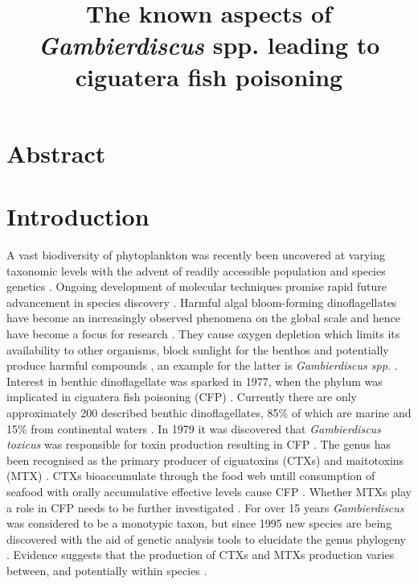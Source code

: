 \documentclass[12pt]{article}
\title{\textbf{The known aspects of \emph{Gambierdiscus} spp. leading to ciguatera fish poisoning}}
\date{}
\begin{document}
\maketitle
\tableofcontents
\section{Abstract}
\section{Introduction}




A vast biodiversity of phytoplankton was recently been uncovered at varying taxonomic levels with the advent of readily accessible population and species genetics \cite{simon2009diversity}. Ongoing development of molecular techniques promise rapid future advancement in species discovery \cite{murray2012genetic,murray2012transcriptomics}. 
Harmful algal bloom-forming dinoflagellates have become an increasingly observed phenomena on the global scale and hence have become a focus for research \cite{berdalet2012global,hallegraeff2010ocean,garces2012habitat}. They cause oxygen depletion which limits its availability to other organisms, block sunlight for the benthos and potentially produce harmful compounds \cite{grandjean2008centers}, an example for the latter is \emph{Gambierdiscus spp.} \cite{lehane2000ciguatera}.
Interest in benthic dinoflagellate was sparked in 1977, when the phylum was implicated in ciguatera fish poisoning (CFP) \cite{yasumoto1977finding}.  
Currently there are only approximately 200 described benthic dinoflagellates, 85\% of which are marine and 15\% from continental waters \cite{gomez2012quantitative}.
In 1979 it was discovered that \emph{Gambierdiscus toxicus} was responsible for toxin production resulting in CFP \cite{adachi1979thecal}. The genus has been recognised as the primary producer of ciguatoxins (CTXs) and maitotoxins (MTX) \cite{chinain1997intraspecific,holmes1998gambierdiscus}. CTXs bioaccumulate through the food web untill consumption of seafood with orally accumulative effective levels cause CFP \cite{bagnis1979clinical,gillespie1987possible,sims1987theoretical}. Whether MTXs play a role in CFP needs to be further investigated \cite{kohli2014feeding}. For over 15 years \emph{Gambierdiscus} was considered to be a monotypic taxon, but since 1995 new species are being discovered with the aid of genetic analysis tools to elucidate the genus phylogeny \cite{faust1995observation,holmes1998gambierdiscus,litaker2009taxonomy,chinain1999morphology,fraga2011gambierdiscus,nishimura2014morphology}. Evidence suggests that the production of CTXs and MTXs production varies between, and potentially within species \cite{chinain2010growth,holland2013differences}.
\end{document}
